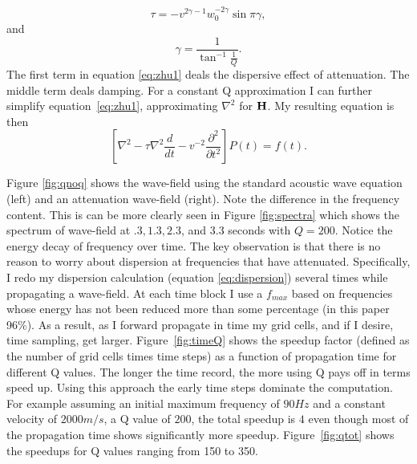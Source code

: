 \begin{equation}
\tau=-v^{2\gamma-1}w_0^{-2\gamma} \sin \pi \gamma,
\end{equation}
and 
\begin{equation}
\gamma=\frac{1}{\tan^{-1}\frac{1}{Q}}.
\end{equation}
The first term in equation \ref{eq:zhu1} deals the dispersive effect of attenuation. The middle term
deals damping.  For a constant Q approximation I can further simplify equation~\ref{eq:zhu1}, approximating
$\nabla^2$ for $\bf H$. My resulting equation is then
\begin{equation}
\left[ \nabla^2 - \tau \nabla^2 \frac{d}{dt} - v^{-2} \frac{\partial^2}{\partial t^2}\right] P(t) =f(t) \label{eq:use}.
\end{equation}
\par
Figure \ref{fig:qnoq} shows the wave-field using the standard acoustic wave equation (left) and an attenuation wave-field (right). Note
the difference in the frequency content. This is can be more clearly seen in
Figure \ref{fig:spectra} which shows the spectrum of wave-field at $.3,1.3,2.3$, and $3.3$ seconds with $Q=200$. Notice the energy
decay of frequency over time. 
The key observation is that there is no reason to worry about dispersion at frequencies that have attenuated. Specifically, I  redo my dispersion calculation (equation \ref{eq:dispersion}) several times while propagating
a wave-field. At each time block I use a $f_{max}$ based on frequencies whose energy has not been reduced more than some percentage (in this paper 96\%).  As a result,  as I forward propagate in time my grid cells, and if I desire,  time sampling,
get larger.  
Figure~\ref{fig:timeQ} shows the speedup factor (defined as the number of grid cells times time steps) as a function of propagation time for different Q values.  The longer the time record, the more using Q pays off in terms speed up. 
Using this approach the early time steps dominate the computation.  For example assuming an initial maximum frequency of 
$90Hz$ and a constant velocity of $2000 m/s$, a Q value of $200$, the total speedup is $4$ even though  most of the 
propagation time  shows significantly more speedup. Figure~\ref{fig:qtot} shows the speedups for Q values ranging from 150 to 350. 



